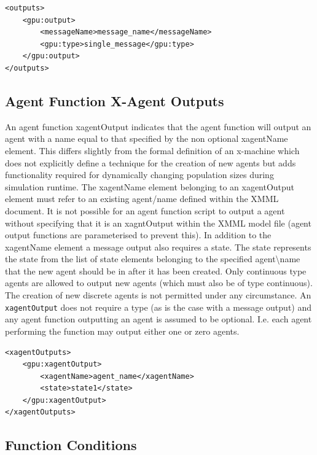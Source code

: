 \documentclass[11pt, a4paper, onecolumn, oneside]{report}
\begin{document}
\begin{verbatim}
<outputs>
    <gpu:output>
        <messageName>message_name</messageName>
        <gpu:type>single_message</gpu:type>
    </gpu:output>
</outputs>
\end{verbatim}

\subsection{Agent Function X-Agent Outputs}
\label{sec:253}

An agent function xagentOutput indicates that the agent function will output an agent with a name equal to that specified by the non optional xagentName element.
This differs slightly from the formal definition of an x-machine which does not explicitly define a technique for the creation of new agents but adds functionality required for dynamically changing population sizes during simulation runtime.
The xagentName element belonging to an xagentOutput element must refer to an existing agent/name defined within the XMML document.
It is not possible for an agent function script to output a agent without specifying that it is an xagntOutput within the XMML model file (agent output functions are parameterised to prevent this).
In addition to the xagentName element a message output also requires a state.
The state represents the state from the list of state elements belonging to the specified agent\textbackslash{}name that the new agent should be in after it has been created.
Only continuous type agents are allowed to output new agents (which must also be of type continuous).
The creation of new discrete agents is not permitted under any circumstance.
An \texttt{xagentOutput} does not require a type (as is the case with a message output) and any agent function outputting an agent is assumed to be optional.
I.e. each agent performing the function may output either one or zero agents.

\begin{verbatim}
<xagentOutputs>
    <gpu:xagentOutput>
        <xagentName>agent_name</xagentName>
        <state>state1</state>
    </gpu:xagentOutput>
</xagentOutputs>
\end{verbatim}

\subsection{Function Conditions}
\label{sec:254}
\end{document}
